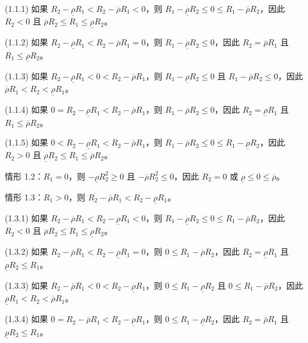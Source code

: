 \documentclass[10.0pt]{article}
\begin{document}
(1.1.1) 如果 $ R_2 - \underline{\rho} R_1 < R_2 - \overline{\rho} R_1 < 0 $，则 $ R_1 - \underline{\rho} R_2 \leqslant 0 \leqslant R_1 - \overline {\rho} R_2 $，因此 $ R_2 < 0 $ 且 $ \overline{\rho} R_2 \leqslant R_1 \leqslant \underline{\rho} R_2 $。

(1.1.2) 如果 $ R_2 - \underline{\rho} R_1 < R_2 - \overline{\rho} R_1 = 0 $，则 $ R_1 - \underline{\rho} R_2 \leqslant 0 $，因此 $ R_2 = \overline{\rho} R_1 $ 且 $ R_1 \leqslant \underline{\rho} R_2 $。

(1.1.3) 如果 $ R_2 - \underline{\rho} R_1 < 0 < R_2 - \overline{\rho} R_1 $，则 $ R_1 - \underline{\rho} R_2 \leqslant 0 $ 且 $ R_1 - \overline{\rho} R_2 \leqslant 0 $，因此 $ \overline{\rho} R_1 < R_2 < \underline{\rho} R_1 $。

(1.1.4) 如果 $ 0 = R_2 - \underline{\rho} R_1 < R_2 - \overline{\rho} R_1 $，则 $ R_1 - \overline{\rho} R_2 \leqslant 0 $，因此 $ R_2 = \underline{\rho} R_1 $ 且 $ R_1 \leqslant \overline{\rho} R_2 $。

(1.1.5) 如果 $ 0 < R_2 - \underline{\rho} R_1 < R_2 - \overline{\rho} R_1 $，则 $ R_1 - \overline{\rho} R_2 \leqslant 0 \leqslant R_1 - \underline {\rho} R_2 $，因此 $ R_2 > 0 $ 且 $ \underline{\rho} R_2 \leqslant R_1 \leqslant \overline{\rho} R_2 $。

情形 1.2：$ R_1 = 0 $，则 $ - \underline{\rho} R_2^2 \geqslant 0 $ 且 $ - \overline{\rho} R_2^2 \leqslant 0 $，因此 $ R_2 = 0 $ 或 $ \underline{\rho} \leqslant 0 \leqslant \overline{\rho} $。

情形 1.3：$ R_1 > 0 $，则 $ R_2 - \overline{\rho} R_1 < R_2 - \underline{\rho} R_1 $。

(1.3.1) 如果 $ R_2 - \overline{\rho} R_1 < R_2 - \underline{\rho} R_1 < 0 $，则 $ R_1 - \underline{\rho} R_2 \leqslant 0 \leqslant R_1 - \overline {\rho} R_2 $，因此 $ R_2 < 0 $ 且 $ \overline{\rho} R_2 \leqslant R_1 \leqslant \underline{\rho} R_2 $。

(1.3.2) 如果 $ R_2 - \overline{\rho} R_1 < R_2 - \underline{\rho} R_1 = 0 $，则 $ 0 \leqslant R_1 - \overline{\rho} R_2 $，因此 $ R_2 = \underline{\rho} R_1 $ 且 $ \underline{\rho} R_2 \leqslant R_1 $。

(1.3.3) 如果 $ R_2 - \overline{\rho} R_1 < 0 < R_2 - \underline{\rho} R_1 $，则 $ 0 \leqslant R_1 - \underline{\rho} R_2 $ 且 $ 0 \leqslant R_1 - \overline{\rho} R_2 $，因此 $ \underline{\rho} R_1 < R_2 < \overline{\rho} R_1 $。

(1.3.4) 如果 $ 0 = R_2 - \overline{\rho} R_1 < R_2 - \underline{\rho} R_1 $，则 $ 0 \leqslant R_1 - \underline{\rho} R_2 $，因此 $ R_2 = \overline{\rho} R_1 $ 且 $ \underline{\rho} R_2 \leqslant R_1 $。
\end{document}
